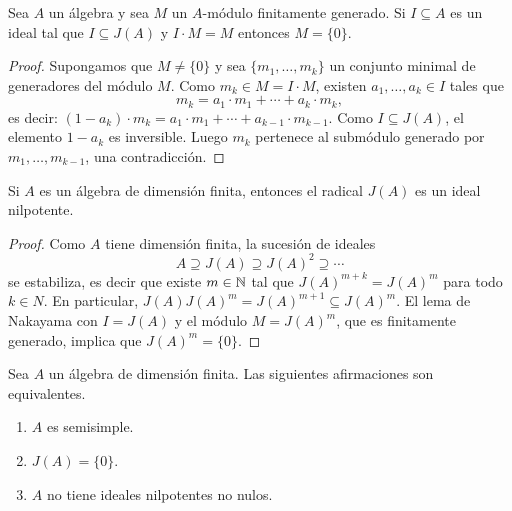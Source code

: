 \begin{lemma}[Nakayama] 
	Sea $A$ un álgebra y sea $M$ un $A$-módulo finitamente generado. Si
	$I\subseteq A$ es un ideal tal que $I\subseteq J(A)$ y $I\cdot M=M$
	entonces $M=\{0\}$.
\end{lemma}

\begin{proof}
	Supongamos que $M\ne\{0\}$ y sea $\{m_1,\dots,m_k\}$ un conjunto minimal de generadores del
	módulo $M$. Como $m_k\in M=I\cdot M$, existen $a_1,\dots,a_k\in I$ tales
	que 
	\[
	m_k=a_1\cdot m_1+\cdots+a_k\cdot m_k,
	\]
	es decir: 
	$(1-a_k)\cdot m_k=a_1\cdot m_1+\cdots+a_{k-1}\cdot m_{k-1}$. Como $I\subseteq J(A)$, el elemento 
	$1-a_k$ es inversible. Luego $m_k$ pertenece al submódulo generado
	por $m_1,\dots,m_{k-1}$, una contradicción.
\end{proof}

\begin{proposition}
\label{pro:J_nilpotente}
Si $A$ es un álgebra de dimensión finita, entonces el radical $J(A)$ es un ideal nilpotente. 	
\end{proposition}

\begin{proof}
	Como $A$ tiene dimensión finita, la sucesión de ideales
	\[
	A\supseteq J(A)\supseteq J(A)^2\supseteq\cdots
	\]
	se estabiliza, es decir que existe $m\in\mathbb{N}$ tal que $J(A)^{m+k}=J(A)^m$ para todo $k\in N$. 
	En particular, 
	$J(A)J(A)^m=J(A)^{m+1}\subseteq J(A)^m$. El lema de Nakayama con $I=J(A)$ y el módulo $M=J(A)^m$, 
	que es finitamente generado, 
	implica que $J(A)^m=\{0\}$.  
\end{proof}

\begin{theorem}
Sea $A$ un álgebra de dimensión finita. Las siguientes afirmaciones son equivalentes.
\begin{enumerate}
\item $A$ es semisimple.
\item $J(A)=\{0\}$.
\item $A$ no tiene ideales nilpotentes no nulos.
\end{enumerate}
\end{theorem}

